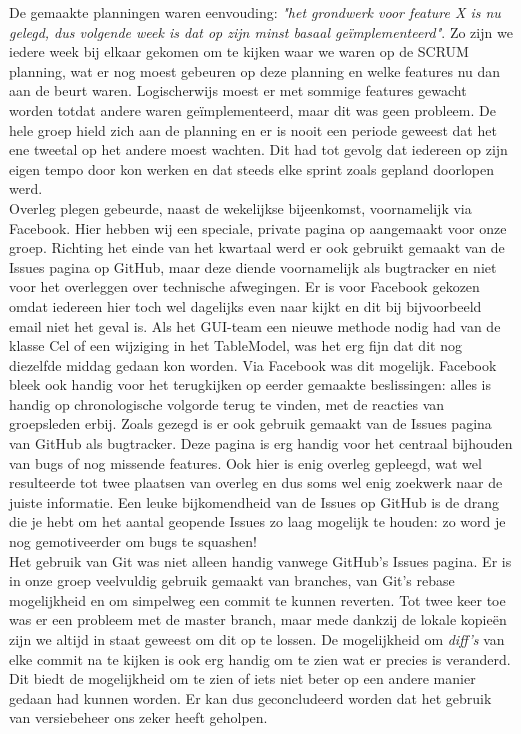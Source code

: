 \documentclass[a4paper,11pt]{article}
\begin{document}
\newpage De gemaakte planningen waren eenvouding: \textit{"het grondwerk voor feature X is nu gelegd, dus volgende week is dat op zijn minst basaal ge\"{i}mplementeerd"}. Zo zijn we iedere week bij elkaar gekomen om te kijken waar we waren op de SCRUM planning, wat er nog moest gebeuren op deze planning en welke features nu dan aan de beurt waren. Logischerwijs moest er met sommige features gewacht worden totdat andere waren ge\"{i}mplementeerd, maar dit was geen probleem. De hele groep hield zich aan de planning en er is nooit een periode geweest dat het ene tweetal op het andere moest wachten. Dit had tot gevolg dat iedereen op zijn eigen tempo door kon werken en dat steeds elke sprint zoals gepland doorlopen werd.\\

Overleg plegen gebeurde, naast de wekelijkse bijeenkomst, voornamelijk via Facebook. Hier hebben wij een speciale, private pagina op aangemaakt voor onze groep. Richting het einde van het kwartaal werd er ook gebruikt gemaakt van de Issues pagina op GitHub, maar deze diende voornamelijk als bugtracker en niet voor het overleggen over technische afwegingen. Er is voor Facebook gekozen omdat iedereen hier toch wel dagelijks even naar kijkt en dit bij bijvoorbeeld email niet het geval is. Als het GUI-team een nieuwe methode nodig had van de klasse Cel of een wijziging in het TableModel, was het erg fijn dat dit nog diezelfde middag gedaan kon worden. Via Facebook was dit mogelijk. Facebook bleek ook handig voor het terugkijken op eerder gemaakte beslissingen: alles is handig op chronologische volgorde terug te vinden, met de reacties van groepsleden erbij. Zoals gezegd is er ook gebruik gemaakt van de Issues pagina van GitHub als bugtracker. Deze pagina is erg handig voor het centraal bijhouden van bugs of nog missende features. Ook hier is enig overleg gepleegd, wat wel resulteerde tot twee plaatsen van overleg en dus soms wel enig zoekwerk naar de juiste informatie. Een leuke bijkomendheid van de Issues op GitHub is de drang die je hebt om het aantal geopende Issues zo laag mogelijk te houden: zo word je nog gemotiveerder om bugs te squashen!\\

Het gebruik van Git was niet alleen handig vanwege GitHub’s Issues pagina. Er is in onze groep veelvuldig gebruik gemaakt van branches, van Git’s rebase mogelijkheid en om simpelweg een commit te kunnen reverten. Tot twee keer toe was er een probleem met de master branch, maar mede dankzij de lokale kopieën zijn we altijd in staat geweest om dit op te lossen. De mogelijkheid om \textit{diff’s} van elke commit na te kijken is ook erg handig om te zien wat er precies is veranderd. Dit biedt de mogelijkheid om te zien of iets niet beter op een andere manier gedaan had kunnen worden. Er kan dus geconcludeerd worden dat het gebruik van versiebeheer ons zeker heeft geholpen.\\
\end{document}
